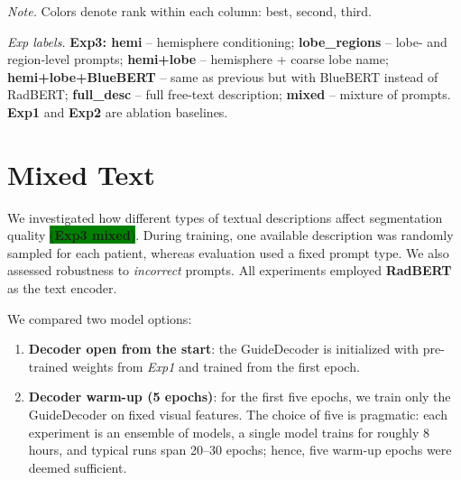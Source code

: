 \documentclass[a4paper,12pt]{article}
\begin{document}
\begin{table}[ht]
\begin{threeparttable}
\begin{tabular}{lccccccc}
\bottomrule
\end{tabular}

\begin{tablenotes}[flushleft]
\footnotesize
\item \textit{Note.} Colors denote rank within each column:
\colorbox{green!20}{best}, \colorbox{blue!20}{second}, \colorbox{orange!20}{third}.
\item \textit{Exp labels.} \textbf{Exp3: hemi} -- hemisphere conditioning; 
\textbf{lobe\_regions} -- lobe- and region-level prompts; 
\textbf{hemi+lobe} -- hemisphere + coarse lobe name; 
\textbf{hemi+lobe+BlueBERT} -- same as previous but with BlueBERT instead of RadBERT; 
\textbf{full\_desc} -- full free-text description; 
\textbf{mixed} -- mixture of prompts. 
\textbf{Exp1} and \textbf{Exp2} are ablation baselines.
\end{tablenotes}
\end{threeparttable}

\end{table}

\clearpage
\section{Mixed Text}
We investigated how different types of textual descriptions affect segmentation quality \colorbox{green}{(\textbf{Exp3 mixed})}. During training, one available description was randomly sampled for each patient, whereas evaluation used a fixed prompt type. We also assessed robustness to \emph{incorrect} prompts. All experiments employed \textbf{RadBERT} as the text encoder.


We compared two model options:
\begin{enumerate}
  \item \textbf{Decoder open from the start}: the GuideDecoder is initialized with pre-trained weights from \textit{Exp1} and trained from the first epoch.
  \item \textbf{Decoder warm-up (5 epochs)}: for the first five epochs, we train only the GuideDecoder on fixed visual features. The choice of five is pragmatic: each experiment is an ensemble of models, a single model trains for roughly 8 hours, and typical runs span 20--30 epochs; hence, five warm-up epochs were deemed sufficient.
\end{enumerate}
\end{document}
